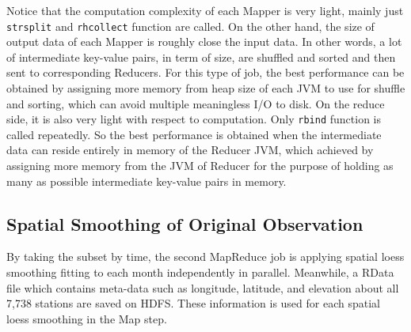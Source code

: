 Notice that the computation complexity of each Mapper is very light, mainly just
\texttt{strsplit} and \texttt{rhcollect} function are called. On the other hand,
the size of output data of each Mapper is roughly close the input data. In other
words, a lot of intermediate key-value pairs, in term of size, are shuffled and
sorted and then sent to corresponding Reducers. For this type of job, the best 
performance can be obtained by assigning more memory from heap size of each JVM 
to use for shuffle and sorting, which can avoid multiple meaningless I/O to disk.  
On the reduce side, it is also very light with respect to computation. Only 
\texttt{rbind} function is called repeatedly. So the best performance is obtained 
when the intermediate data can reside entirely in memory of the Reducer JVM, 
which achieved by assigning more memory from the JVM of Reducer for the purpose
of holding as many as possible intermediate key-value pairs in memory. 

\subsection{Spatial Smoothing of Original Observation}

By taking the subset by time, the second 
MapReduce job is applying spatial loess smoothing fitting to each month 
independently in parallel. Meanwhile, a RData file which contains meta-data such
as longitude, latitude, and elevation about all 7,738 stations are saved on HDFS.
These information is used for each spatial loess smoothing in the Map step. 

